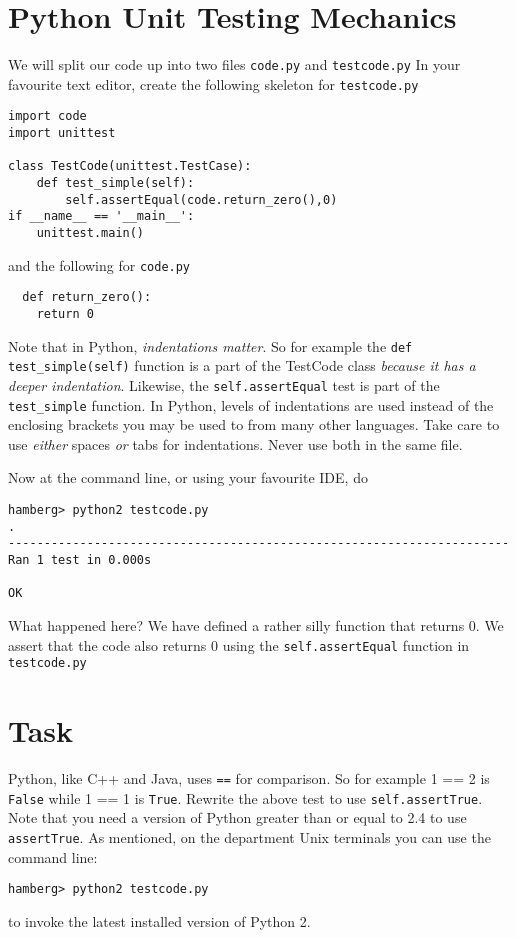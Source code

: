 \documentclass{paper}
\begin{document}
\section*{Python Unit Testing Mechanics}
We will split our code up into two files \texttt{code.py} and
\texttt{testcode.py} In your favourite text editor, create the following
skeleton for \texttt{testcode.py}

\begin{lstlisting}
import code
import unittest

class TestCode(unittest.TestCase):
    def test_simple(self):
        self.assertEqual(code.return_zero(),0)
if __name__ == '__main__':
    unittest.main()
\end{lstlisting}

and the following for {\tt code.py}

\begin{lstlisting}
  def return_zero():
    return 0
\end{lstlisting}
Note that in Python, \emph{indentations matter}. So for example the {\tt def
  test\_simple(self)} function is a part of the TestCode class \emph{because
  it has a deeper indentation}. Likewise, the {\tt self.assertEqual} test is
part of the {\tt test\_simple} function. In Python, levels of indentations are
used instead of the enclosing brackets you may be used to from many other
languages. Take care to use \emph{either} spaces \emph{or} tabs for
indentations. Never use both in the same file.

Now at the command line, or using your favourite IDE, do
\begin{verbatim}
hamberg> python2 testcode.py
.
----------------------------------------------------------------------
Ran 1 test in 0.000s

OK

\end{verbatim}
What happened here? We have defined a rather silly function that returns 0. We
assert that the code also returns 0 using the {\tt self.assertEqual} function
in {\tt testcode.py}
  
\section{Task}
Python, like C++ and Java, uses {\tt ==} for comparison. So for example {1 ==
  2} is {\tt False} while {1 == 1} is {\tt True}. Rewrite the above test to
use {\tt self.assertTrue}. Note that you need a version of Python greater than
or equal to 2.4 to use {\tt assertTrue}. As mentioned, on the department Unix
terminals you can use the command line:
\begin{verbatim}
hamberg> python2 testcode.py
\end{verbatim}
to invoke the latest installed version of Python 2.
\end{document}
